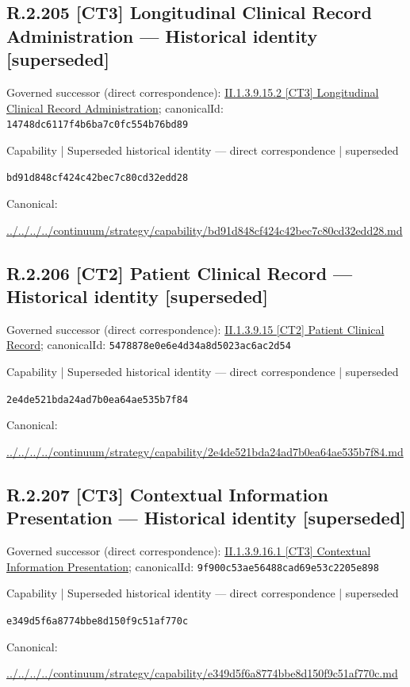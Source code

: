 \documentclass[10pt,a4paper]{article}
\begin{document}
\subsection*{R.2.205 [CT3] Longitudinal Clinical Record Administration — Historical identity [superseded]}
Governed successor (direct correspondence): \hyperref[element-14748dc6117f4b6ba7c0fc554b76bd89]{II.1.3.9.15.2 [CT3] Longitudinal Clinical Record Administration}; canonicalId: \texttt{14748dc6117f4b6ba7c0fc554b76bd89}\par
\label{element-bd91d848cf424c42bec7c80cd32edd28}
{\small Capability | Superseded historical identity — direct correspondence | superseded}\par
\texttt{bd91d848cf424c42bec7c80cd32edd28}\par
Canonical: \par
{\footnotesize\url{../../../../continuum/strategy/capability/bd91d848cf424c42bec7c80cd32edd28.md}}\par
\subsection*{R.2.206 [CT2] Patient Clinical Record — Historical identity [superseded]}
Governed successor (direct correspondence): \hyperref[element-5478878e0e6e4d34a8d5023ac6ac2d54]{II.1.3.9.15 [CT2] Patient Clinical Record}; canonicalId: \texttt{5478878e0e6e4d34a8d5023ac6ac2d54}\par
\label{element-2e4de521bda24ad7b0ea64ae535b7f84}
{\small Capability | Superseded historical identity — direct correspondence | superseded}\par
\texttt{2e4de521bda24ad7b0ea64ae535b7f84}\par
Canonical: \par
{\footnotesize\url{../../../../continuum/strategy/capability/2e4de521bda24ad7b0ea64ae535b7f84.md}}\par
\subsection*{R.2.207 [CT3] Contextual Information Presentation — Historical identity [superseded]}
Governed successor (direct correspondence): \hyperref[element-9f900c53ae56488cad69e53c2205e898]{II.1.3.9.16.1 [CT3] Contextual Information Presentation}; canonicalId: \texttt{9f900c53ae56488cad69e53c2205e898}\par
\label{element-e349d5f6a8774bbe8d150f9c51af770c}
{\small Capability | Superseded historical identity — direct correspondence | superseded}\par
\texttt{e349d5f6a8774bbe8d150f9c51af770c}\par
Canonical: \par
{\footnotesize\url{../../../../continuum/strategy/capability/e349d5f6a8774bbe8d150f9c51af770c.md}}\par
\end{document}
